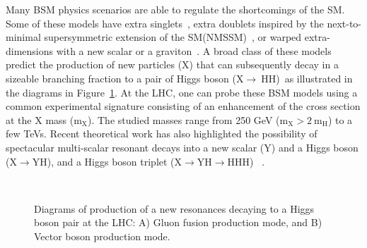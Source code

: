 Many BSM physics scenarios are able to regulate the shortcomings of the SM. Some of these models have extra singlets~\cite{Robens,Dawson:2015haa}, extra doublets inspired by the next-to-minimal supersymmetric extension of the SM(NMSSM)~\cite{Ellwanger:2009dp,Djouadi}, or warped extra-dimensions with a new scalar or a graviton~\cite{RandallSundrum,Oliveira:2014kla}.  A broad class of these models predict the production of new particles (X) that can subsequently decay in a sizeable branching fraction to a pair of Higgs boson ($\mathrm{X\rightarrow~HH}$)~as illustrated in the diagrams in Figure~\ref{fig:resonances}. At the LHC, one can probe these BSM models using a common experimental signature consisting of an enhancement of the cross section at the X mass ($\mathrm{m_{X}}$). The studied masses range from 250 GeV ($\mathrm{m_{X}>2~m_{H}}$) to a few TeVs. Recent theoretical work has also highlighted the possibility of spectacular multi-scalar resonant decays into a new scalar (Y) and a Higgs boson ($\mathrm{X\rightarrow YH}$), and a Higgs boson triplet ($\mathrm{X\rightarrow YH\rightarrow HHH}$) ~\cite{Ellwanger:2017skc,Robens:2019kga}.

\begin{figure}[htp!]
\centering
\captionsetup[subfigure]{justification=centering}
\\
\caption[Diagrams of production of a new resonances decaying to a Higgs boson pair at the LHC]{Diagrams of production of a new resonances decaying to a Higgs boson pair at the LHC: A) Gluon fusion production mode, and B) Vector boson production mode.}
\label{fig:resonances}
\end{figure}

